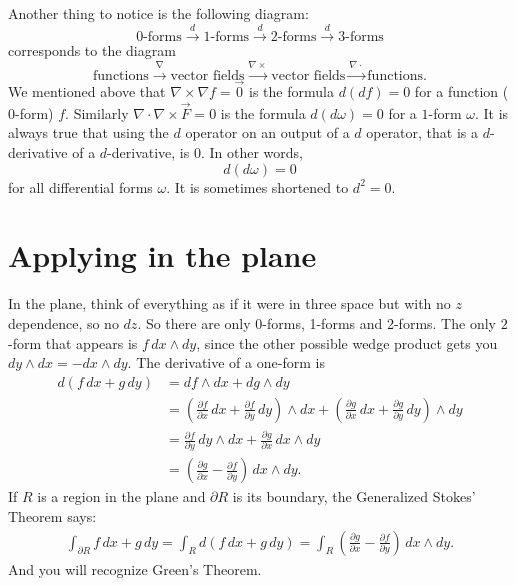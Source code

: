 \documentclass[12pt]{article}
\begin{document}
Another thing to notice is the following diagram:
\[
\text{0-forms} \overset{d}{\to}
\text{1-forms} \overset{d}{\to}
\text{2-forms} \overset{d}{\to}
\text{3-forms}
\]
corresponds to the diagram
\[
\text{functions} \overset{\nabla}{\to}
\text{vector fields} \overset{\nabla \times {}}{\to}
\text{vector fields} \overset{\nabla \cdot {}}{\to}
\text{functions} .
\]
We mentioned above that $\nabla \times \nabla f = \vec{0}$ is the formula $d(df) = 0$
for a function ($0$-form) $f$.
Similarly $\nabla \cdot \nabla \times \vec{F} = 0$ is the formula $d(d\omega) = 0$
for a $1$-form $\omega$.  It is always true that using the
$d$ operator on an output of a $d$ operator,
that is a $d$-derivative of a $d$-derivative, is $0$.  In other words,
\[
d(d\omega) = 0
\]
for all differential forms $\omega$.  It is sometimes shortened to $d^2 = 0$.

\section*{Applying in the plane}

In the plane, think of everything as if it were in three space but
with no $z$ dependence, so no $dz$.  So there are only 0-forms, 1-forms and 2-forms.
The only $2$-form that appears is $f \, dx \wedge dy$, since
the other possible wedge product gets you $dy \wedge dx = - dx \wedge dy$.
The derivative of a one-form is
\begin{equation*}
\begin{split}
d(f \, dx + g \, dy)
& =
df \wedge dx + dg \wedge dy
\\
& =
\left(\frac{\partial f}{\partial x} \, dx + \frac{\partial f}{\partial y} \, dy \right)  \wedge dx
+
\left(\frac{\partial g}{\partial x} \, dx + \frac{\partial g}{\partial y} \, dy \right)  \wedge dy
\\
& =
\frac{\partial f}{\partial y} \, dy \wedge dx
+
\frac{\partial g}{\partial x} \, dx  \wedge dy
\\
& =
\left(\frac{\partial g}{\partial x} -
\frac{\partial f}{\partial y} \right) \,dx  \wedge dy .
\end{split}
\end{equation*}
If $R$ is a region in the plane and $\partial R$ is its boundary, 
the Generalized Stokes' Theorem says:
\begin{equation*}
\begin{split}
\int_{\partial R}
f \, dx + g \, dy
=
\int_R 
d (f \, dx + g \, dy)
=
\int_R
\left(\frac{\partial g}{\partial x} -
\frac{\partial f}{\partial y} \right) \,dx  \wedge dy .
\end{split}
\end{equation*}
And you will recognize Green's Theorem.
\end{document}
